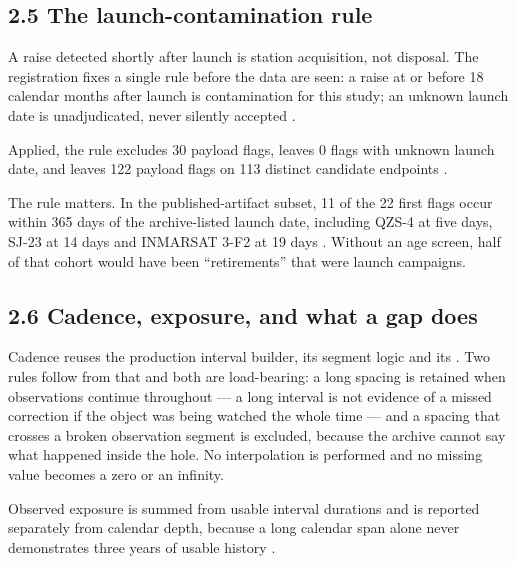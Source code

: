 \documentclass[11pt]{article}
\begin{document}
\subsection*{2.5 The launch-contamination rule}

A raise detected shortly after launch is station acquisition, not disposal. The registration fixes a single rule before the data are seen: a raise at or before 18 calendar months after launch is contamination for this study; an unknown launch date is unadjudicated, never silently accepted%
.

Applied, the rule excludes 30 payload flags, leaves 0 flags with unknown launch date, and leaves 122 payload flags on 113 distinct candidate endpoints%
.

The rule matters. In the published-artifact subset, 11 of the 22 first flags occur within 365 days of the archive-listed launch date, including QZS-4 at five days, SJ-23 at 14 days and INMARSAT 3-F2 at 19 days%
. Without an age screen, half of that cohort would have been ``retirements'' that were launch campaigns.

\subsection*{2.6 Cadence, exposure, and what a gap does}

Cadence reuses the production interval builder, its segment logic and its %
. Two rules follow from that and both are load-bearing: a long spacing is retained when observations continue throughout --- a long interval is not evidence of a missed correction if the object was being watched the whole time --- and a spacing that crosses a broken observation segment is excluded, because the archive cannot say what happened inside the hole. No interpolation is performed and no missing value becomes a zero or an infinity.

Observed exposure is summed from usable interval durations and is reported separately from calendar depth, because a long calendar span alone never demonstrates three years of usable history%
.
\end{document}
